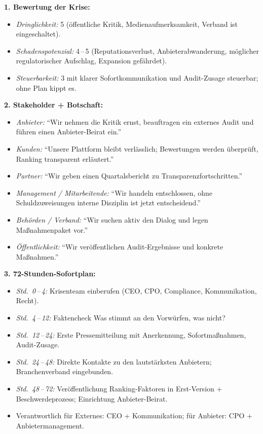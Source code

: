 \documentclass[11pt,a4paper,oneside]{article}
\begin{document}
\begin{loesungbox}
\textbf{1. Bewertung der Krise:}
\begin{itemize}
  \item \emph{Dringlichkeit:} 5 (öffentliche Kritik, Medienaufmerksamkeit, Verband ist eingeschaltet).
  \item \emph{Schadenspotenzial:} 4\,--\,5 (Reputationsverlust, Anbieterabwanderung, möglicher regulatorischer Aufschlag, Expansion gefährdet).
  \item \emph{Steuerbarkeit:} 3 \textendash{} mit klarer Sofortkommunikation und Audit-Zusage steuerbar; ohne Plan kippt es.
\end{itemize}

\textbf{2. Stakeholder + Botschaft:}
\begin{itemize}
  \item \emph{Anbieter:} ``Wir nehmen die Kritik ernst, beauftragen ein externes Audit und führen einen Anbieter-Beirat ein.''
  \item \emph{Kunden:} ``Unsere Plattform bleibt verlässlich; Bewertungen werden überprüft, Ranking transparent erläutert.''
  \item \emph{Partner:} ``Wir geben einen Quartalsbericht zu Transparenzfortschritten.''
  \item \emph{Management / Mitarbeitende:} ``Wir handeln entschlossen, ohne Schuldzuweisungen \textendash{} interne Disziplin ist jetzt entscheidend.''
  \item \emph{Behörden / Verband:} ``Wir suchen aktiv den Dialog und legen Maßnahmenpaket vor.''
  \item \emph{Öffentlichkeit:} ``Wir veröffentlichen Audit-Ergebnisse und konkrete Maßnahmen.''
\end{itemize}

\textbf{3. 72-Stunden-Sofortplan:}
\begin{itemize}
  \item \emph{Std.\ 0\,--\,4:} Krisenteam einberufen (CEO, CPO, Compliance, Kommunikation, Recht).
  \item \emph{Std.\ 4\,--\,12:} Faktencheck \textendash{} Was stimmt an den Vorwürfen, was nicht?
  \item \emph{Std.\ 12\,--\,24:} Erste Pressemitteilung mit Anerkennung, Sofortmaßnahmen, Audit-Zusage.
  \item \emph{Std.\ 24\,--\,48:} Direkte Kontakte zu den lautstärksten Anbietern; Branchenverband eingebunden.
  \item \emph{Std.\ 48\,--\,72:} Veröffentlichung Ranking-Faktoren in Erst-Version + Beschwerdeprozess; Einrichtung Anbieter-Beirat.
  \item Verantwortlich für Externes: CEO + Kommunikation; für Anbieter: CPO + Anbietermanagement.
\end{itemize}


\end{loesungbox}
\end{document}
